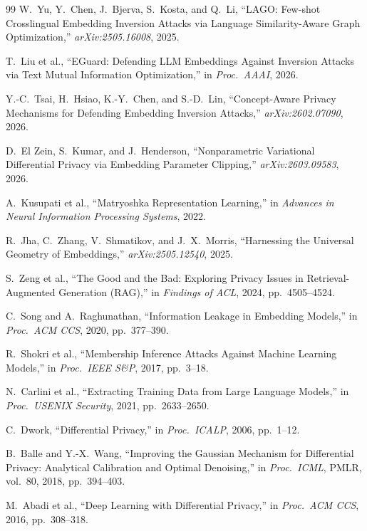 \begin{thebibliography}{99}
 W.\ Yu, Y.\ Chen, J.\ Bjerva, S.\ Kosta, and Q.\ Li,
``LAGO: Few-shot Crosslingual
Embedding Inversion Attacks via Language Similarity-Aware Graph
Optimization,'' \emph{arXiv:2505.16008}, 2025.

 T.\ Liu et al., ``EGuard: Defending LLM Embeddings
Against Inversion Attacks via Text Mutual Information Optimization,''
in \emph{Proc.\ AAAI}, 2026.

 Y.-C.\ Tsai, H.\ Hsiao, K.-Y.\ Chen, and S.-D.\
Lin, ``Concept-Aware Privacy Mechanisms for Defending Embedding
Inversion Attacks,'' \emph{arXiv:2602.07090}, 2026.

 D.\ El Zein, S.\ Kumar, and J.\ Henderson,
``Nonparametric Variational Differential Privacy via Embedding Parameter
Clipping,'' \emph{arXiv:2603.09583}, 2026.

 A.\ Kusupati et al., ``Matryoshka Representation
Learning,'' in \emph{Advances in Neural Information Processing Systems},
2022.

 R.\ Jha, C.\ Zhang, V.\ Shmatikov, and J.\ X.\
Morris, ``Harnessing the Universal Geometry of Embeddings,''
\emph{arXiv:2505.12540}, 2025.

 S.\ Zeng et al., ``The Good and the Bad:
Exploring Privacy Issues in Retrieval-Augmented Generation (RAG),''
in \emph{Findings of ACL}, 2024, pp.\ 4505--4524.

 C.\ Song and A.\ Raghunathan, ``Information
Leakage in Embedding Models,'' in \emph{Proc.\ ACM CCS}, 2020,
pp.\ 377--390.

 R.\ Shokri et al., ``Membership Inference Attacks
Against Machine Learning Models,'' in \emph{Proc.\ IEEE S\&P},
2017, pp.\ 3--18.

 N.\ Carlini et al., ``Extracting Training Data
from Large Language Models,'' in \emph{Proc.\ USENIX Security},
2021, pp.\ 2633--2650.

 C.\ Dwork, ``Differential Privacy,'' in
\emph{Proc.\ ICALP}, 2006, pp.\ 1--12.

 B.\ Balle and Y.-X.\ Wang,
``Improving the Gaussian Mechanism for Differential Privacy: Analytical
Calibration and Optimal Denoising,'' in \emph{Proc.\ ICML}, PMLR, vol.\ 80,
2018, pp.\ 394--403.

 M.\ Abadi et al., ``Deep Learning with Differential
Privacy,'' in \emph{Proc.\ ACM CCS}, 2016, pp.\ 308--318.


\end{thebibliography}
